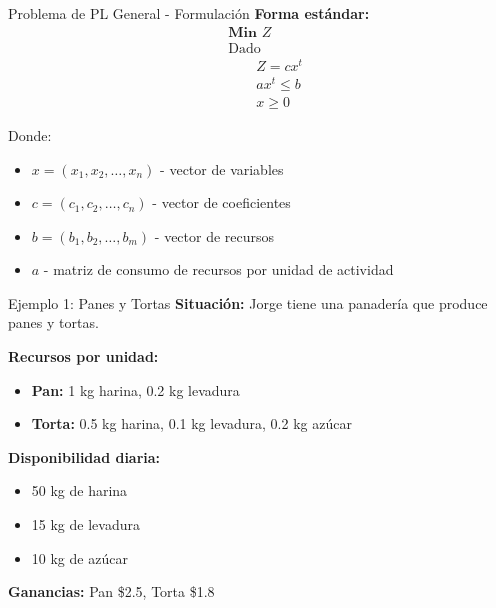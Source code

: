 \documentclass{beamer}
\begin{document}
\begin{frame}{Problema de PL General - Formulación}
    \textbf{Forma estándar:}
    \begin{align*}
        &\textbf{Min } Z \\
        &\text{Dado} \\
        &\qquad Z = c x^t \\
        &\qquad a x^t \leq b \\
        &\qquad x \geq 0
    \end{align*}
    
    Donde:
    \begin{itemize}
        \item $x = (x_1, x_2, \ldots, x_n)$ - vector de variables
        \item $c = (c_1, c_2, \ldots, c_n)$ - vector de coeficientes
        \item $b = (b_1, b_2, \ldots, b_m)$ - vector de recursos
        \item $a$ - matriz de consumo de recursos por unidad de actividad
    \end{itemize}
\end{frame}

\begin{frame}{Ejemplo 1: Panes y Tortas}
    \textbf{Situación:}
    Jorge tiene una panadería que produce panes y tortas.
    
    \vspace{1em}
    \textbf{Recursos por unidad:}
    \begin{itemize}
        \item \textbf{Pan:} 1 kg harina, 0.2 kg levadura
        \item \textbf{Torta:} 0.5 kg harina, 0.1 kg levadura, 0.2 kg azúcar
    \end{itemize}
    
    \vspace{1em}
    \textbf{Disponibilidad diaria:}
    \begin{itemize}
        \item 50 kg de harina
        \item 15 kg de levadura  
        \item 10 kg de azúcar
    \end{itemize}
    
    \vspace{1em}
    \textbf{Ganancias:} Pan \$2.5, Torta \$1.8
\end{frame}
\end{document}
